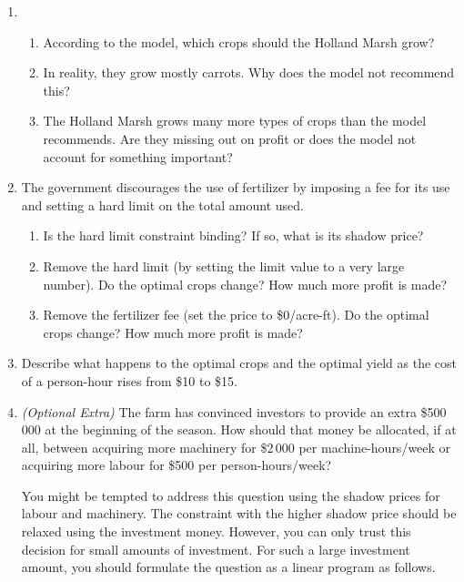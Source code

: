 \documentclass[letter]{article}
\begin{document}
\begin{enumerate}[resume,label=\textbf{\arabic*.}]

	\item 
	\begin{enumerate}[label=\textbf{(\alph*)}]
		\item According to the model, which crops should the Holland Marsh grow?
		\item In reality, they grow mostly carrots. Why does the model not recommend this?
		\item The Holland Marsh grows many more types of crops than the model recommends. Are they missing out on profit or does the model not account for something important?
	\end{enumerate}
	
	
	\item The government discourages the use of fertilizer by imposing a fee for its use and setting a hard limit on the total amount used.

	\begin{enumerate}[label=\textbf{(\alph*)}]
		\item Is the hard limit constraint binding? If so, what is its shadow price?
		\item Remove the hard limit (by setting the limit value to a very large number). Do the optimal crops change? How much more profit is made?
		\item Remove the fertilizer fee (set the price to \$0/acre-ft). Do the optimal crops change? How much more profit is made?

	\end{enumerate}
	
	
	\item Describe what happens to the optimal crops and the optimal yield as the cost of a person-hour rises from \$10 to \$15.
	
	\item \textit{(Optional Extra)} The farm has convinced investors to provide an extra \$500\,000 at the beginning of the season. How should that money be allocated, if at all, between acquiring more machinery for \$2\,000 per machine-hours/week or acquiring more labour for \$500 per person-hours/week?
	
	
You might be tempted to address this question using the shadow prices for labour and machinery. The constraint with the higher shadow price should be relaxed using the investment money. However, you can only trust this decision for small amounts of investment. For such a large investment amount, you should formulate the question as a linear program as follows.


\end{enumerate}
\end{document}
